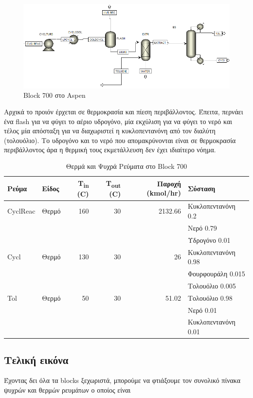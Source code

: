 \documentclass[11pt]{article}
\begin{document}
\begin{figure}[htbp]
\centering
\includegraphics[width=.9\linewidth]{Block_700_-_Καθαρισμός_της_Κυκλοπεντανόνης/2023-03-17_18-13-36_screenshot.png}
\caption{Block 700 στο Aspen}
\end{figure}

Αρχικά το προιόν έρχεται σε θερμοκρασία και πίεση περιβάλλοντος. Έπειτα, περνάει ένα flash για να φύγει το αέριο υδρογόνο, μία εκχύλιση για να φύγει το νερό και τέλος μία απόσταξη για να διαχωριστεί η κυκλοπεντανόνη από τον διαλύτη (τολουόλιο). Το υδρογόνο και το νερό που απομακρύνονται είναι σε θερμοκρασία περιβάλλοντος άρα η θερμική τους εκμετάλλευση δεν έχει ιδιαίτερο νόημα.

\begin{table}[htbp]
\caption{Θερμά και Ψυχρά Ρεύματα στο Block 700}
\centering
\begin{tabular}{llrrrl}
Ρεύμα & Είδος & Τ\textsubscript{in} (C) & Τ\textsubscript{out} (C) & Παροχή (kmol/hr) & Σύσταση\\
\hline
CyclReac & Θερμό & 160 & 30 & 2132.66 & Κυκλοπεντανόνη 0.2\\
 &  &  &  &  & Νερό 0.79\\
 &  &  &  &  & Υδρογόνο 0.01\\
\hline
Cycl & Θερμό & 130 & 30 & 26 & Κυκλοπεντανόνη 0.98\\
 &  &  &  &  & Φουρφουράλη 0.015\\
 &  &  &  &  & Τολουόλιο 0.005\\
\hline
Tol & Θερμό & 50 & 30 & 51.02 & Τολουόλιο 0.98\\
 &  &  &  &  & Νερό 0.01\\
 &  &  &  &  & Κυκλοπεντανόνη 0.01\\
\hline
\end{tabular}
\end{table}

\subsection{Τελική εικόνα}
\label{sec:orgc634cb3}
Έχοντας δει όλα τα blocks ξεχωριστά, μπορούμε να φτιάξουμε τον συνολικό πίνακα ψυχρών και θερμών ρευμάτων ο οποίος είναι
\end{document}
